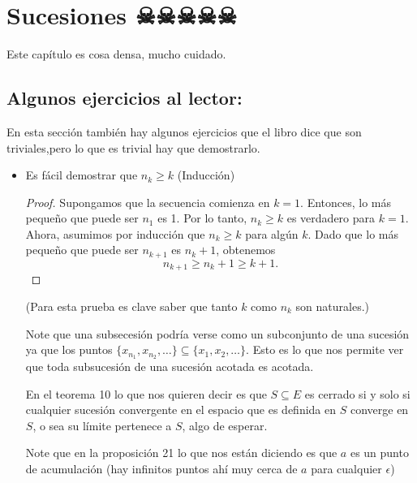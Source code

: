 \section{Sucesiones ☠☠☠☠☠}

Este capítulo es cosa densa, mucho cuidado.

\subsection{Algunos ejercicios al lector:}

En esta sección también hay algunos ejercicios que el libro dice que son triviales,pero lo que es trivial hay que demostrarlo.

\begin{itemize}[label={✎}]

\item Es fácil demostrar que $n_k\geq k$ (Inducción)

\begin{proof}
Supongamos que la secuencia comienza en $k=1$. Entonces, lo más pequeño que puede ser $n_1$ es 1. Por lo tanto, $n_k \geq k$ es verdadero para $k=1$. Ahora, asumimos por inducción que $n_k \geq k$ para algún $k$. Dado que lo más pequeño que puede ser $n_{k+1}$ es $n_k+1$, obtenemos
$$
n_{k+1} \geq n_k+1 \geq k+1.
$$
\end{proof}

(Para esta prueba es clave saber que tanto $k$ como $n_k$ son naturales.)

\begin{note}
Note que una subsecesión podría verse como un subconjunto de una sucesión ya que los puntos $\{x_{n_1},x_{n_2},\ldots\}\subseteq\{x_1,x_2,\ldots\}$. Esto es lo que nos permite ver que toda subsucesión de una sucesión acotada es acotada.


\end{note}

\begin{note}
En el teorema 10 lo que nos quieren decir es que $S\subseteq E$ es cerrado si y solo si cualquier sucesión convergente en el espacio que es definida en $S$ converge en $S$, o sea su límite pertenece a $S$, algo de esperar.
\end{note}

\begin{note}
Note que en la proposición 21 lo que nos están diciendo es que $a$ es un punto de acumulación (hay infinitos puntos ahí muy cerca de $a$ para cualquier $\epsilon$) 
\end{note}


\end{itemize}
